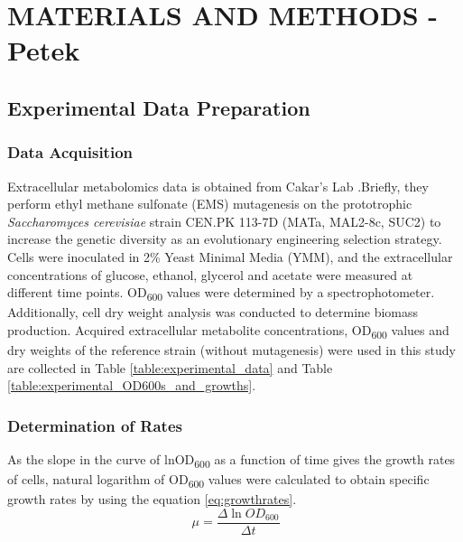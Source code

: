 \chapter{MATERIALS AND METHODS - Petek}

\section{Experimental Data Preparation}
\subsection{Data Acquisition}
Extracellular metabolomics data is obtained from Cakar's Lab \cite{arslan2018physiological}.Briefly, they perform ethyl methane sulfonate (EMS) mutagenesis  on the prototrophic \emph{Saccharomyces cerevisiae} strain CEN.PK 113-7D (MATa, MAL2-8c, SUC2) to increase the genetic diversity as an evolutionary engineering selection strategy. Cells were inoculated in 2\% Yeast Minimal Media (YMM), and the extracellular concentrations of glucose, ethanol, glycerol and acetate were measured at different time points. OD\textsubscript{600} values were determined by a spectrophotometer. Additionally, cell dry weight analysis was conducted to determine biomass production. Acquired extracellular metabolite concentrations, OD\textsubscript{600} values and dry weights of the reference strain (without mutagenesis) were used in this study are collected in Table \ref{table:experimental_data} and Table \ref{table:experimental_OD600s_and_growths}.




\subsection{Determination of Rates}
As the slope in the curve of lnOD\textsubscript{600} as a function of time gives the growth rates of cells, natural logarithm of OD\textsubscript{600} values were calculated to obtain specific growth rates by using the equation \ref{eq:growthrates}.
  \begin{equation}
      \ \mu = \frac{\Delta \ln{OD_{600}}}{\Delta t}
      \label{eq:growthrates}
  \end{equation}

